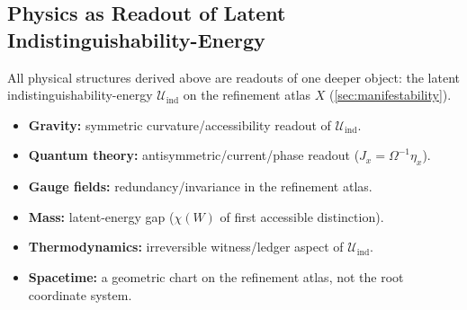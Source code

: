 \subsection{Physics as Readout of Latent Indistinguishability-Energy}
\label{sec:physics:readout}

All physical structures derived above are readouts of one deeper object:
the latent indistinguishability-energy $\mathcal{U}_{\mathrm{ind}}$ on
the refinement atlas $X$ (\cref{sec:manifestability}).

\begin{itemize}[nosep]
  \item \textbf{Gravity:} symmetric curvature/accessibility readout of
        $\mathcal{U}_{\mathrm{ind}}$.
  \item \textbf{Quantum theory:} antisymmetric/current/phase readout
        ($J_x = \Omega^{-1}\eta_x$).
  \item \textbf{Gauge fields:} redundancy/invariance in the refinement atlas.
  \item \textbf{Mass:} latent-energy gap ($\chi(W)$ of first accessible
        distinction).
  \item \textbf{Thermodynamics:} irreversible witness/ledger aspect of
        $\mathcal{U}_{\mathrm{ind}}$.
  \item \textbf{Spacetime:} a geometric chart on the refinement atlas, not
        the root coordinate system.
\end{itemize}
